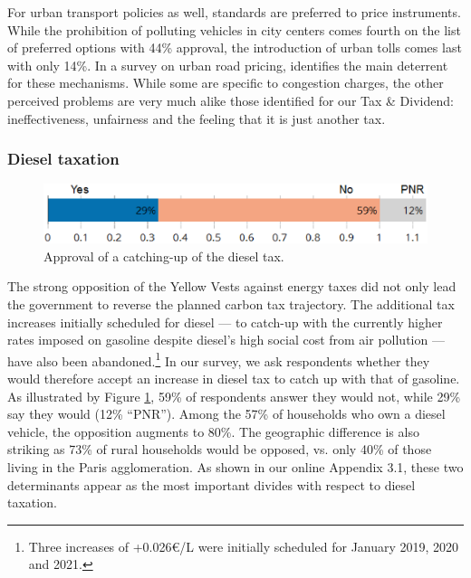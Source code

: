 \documentclass[english,5p,authoryear]{elsarticle}
\begin{document}
For urban transport policies as well, standards are preferred to price instruments. While the prohibition of polluting vehicles in city centers comes fourth on the list of preferred options with 44\% approval, the introduction of urban tolls comes last with only 14\%. In a survey on urban road pricing, \citet{jones_1998} identifies the main deterrent for these mechanisms. While some are specific to congestion charges, the other perceived problems are very much alike those identified for our Tax \& Dividend: ineffectiveness, unfairness and the feeling that it is just another tax.

        \subsubsection{Diesel taxation}

%

\begin{figure}[b]
\centering
\includegraphics[width=0.9\columnwidth]{Images_EPS/diesel_catch_up_trim.eps}
\caption{Approval of a catching-up of the diesel tax.}
\label{fig:diesel}
\end{figure}

The strong opposition of the Yellow Vests against energy taxes did not only lead the government to reverse the planned carbon tax trajectory. The additional tax increases initially scheduled for diesel --- to catch-up with the currently higher rates imposed on gasoline despite diesel's high social cost from air pollution  --- have also been abandoned.\footnote{Three increases of +0.026\euro{}/L were initially scheduled for January 2019, 2020 and 2021.}  In our survey, we ask respondents whether they would therefore accept an increase in diesel tax to catch up with that of gasoline. As illustrated by Figure \ref{fig:diesel}, 59\% of respondents answer they would not, while 29\% say they would (12\% ``PNR''). Among the 57\% of households who own a diesel vehicle, the opposition augments to 80\%. The geographic difference is also striking as 73\% of rural households would be opposed, vs. only 40\% of those living in the Paris agglomeration. As shown in our online Appendix 3.1, these two determinants appear as the most important divides with respect to diesel taxation.
%

%
\end{document}
